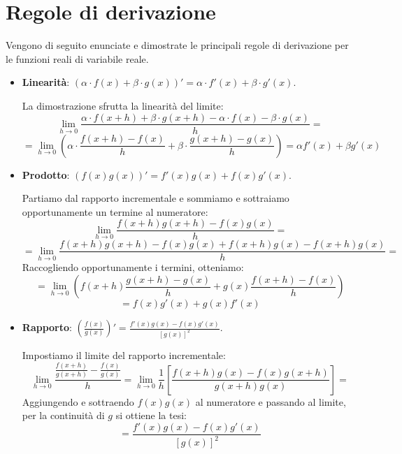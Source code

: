 \documentclass[12pt]{report}
\begin{document}
	\section{Regole di derivazione}
	
	Vengono di seguito enunciate e dimostrate le principali regole di derivazione per le funzioni reali di variabile reale.
	
	\begin{itemize}
		
		\item \textbf{Linearità}: $(\alpha \cdot f(x) + \beta \cdot g(x))' = \alpha \cdot f'(x) + \beta \cdot g'(x)$.
		\begin{dimostrazione}{}{}
			
			La dimostrazione sfrutta la linearità del limite:
			\[
			\lim_{h \to 0} \frac{\alpha \cdot f(x+h) + \beta \cdot g(x+h) - \alpha \cdot f(x) - \beta \cdot g(x)}{h} =
			\]
			\[
			= \lim_{h \to 0} \left( \alpha \cdot \frac{f(x+h) - f(x)}{h} + \beta \cdot \frac{g(x+h) - g(x)}{h} \right) = \alpha f'(x) + \beta g'(x)
			\]
			
		\end{dimostrazione}
		
		\item \textbf{Prodotto}: $(f(x)g(x))' = f'(x)g(x) + f(x)g'(x)$.
		\begin{dimostrazione}{}{}
			
			Partiamo dal rapporto incrementale e sommiamo e sottraiamo opportunamente un termine al numeratore:
			\[
			\lim_{h \to 0} \frac{f(x+h)g(x+h) - f(x)g(x)}{h} =
			\]
			\[
			= \lim_{h \to 0} \frac{f(x+h)g(x+h) - f(x)g(x) + f(x+h)g(x) - f(x+h)g(x)}{h} =
			\]
			Raccogliendo opportunamente i termini, otteniamo:
			\[
			= \lim_{h \to 0} \left( f(x+h) \frac{g(x+h) - g(x)}{h} + g(x) \frac{f(x+h) - f(x)}{h} \right)
			\]
			\[
			= f(x)g'(x) + g(x)f'(x)
			\]
			
		\end{dimostrazione}
		
		\item \textbf{Rapporto}: $\left(\frac{f(x)}{g(x)}\right)' = \frac{f'(x)g(x) - f(x)g'(x)}{[g(x)]^2}$.
		\begin{dimostrazione}{}{}
			
			Impostiamo il limite del rapporto incrementale:
			\[
			\lim_{h \to 0} \frac{\frac{f(x+h)}{g(x+h)} - \frac{f(x)}{g(x)}}{h} = \lim_{h \to 0} \frac{1}{h} \left[ \frac{f(x+h)g(x) - f(x)g(x+h)}{g(x+h)g(x)} \right] =
			\]
			Aggiungendo e sottraendo $f(x)g(x)$ al numeratore e passando al limite, per la continuità di $g$ si ottiene la tesi:
			\[
			= \frac{f'(x)g(x) - f(x)g'(x)}{[g(x)]^2}
			\]
			
		\end{dimostrazione}
		
	\end{itemize}
	
\end{document}

